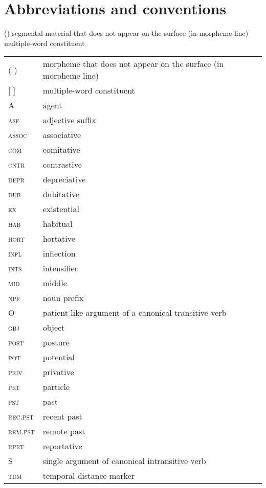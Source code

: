 \documentclass[output=paper]{langsci/langscibook}
\begin{document}
\section*{Abbreviations and conventions}
() segmental material that does not appear on the surface (in morpheme line)\\
[] multiple-word constituent

\begin{tabularx}{\textwidth}{lQ}
    ( ) & morpheme that does not appear on the surface (in morpheme line) \\
    {[} {]} & multiple-word constituent \\
    A & agent \\
    \textsc{asf} & adjective suffix \\
    \textsc{assoc} & associative \\
    \textsc{com} & comitative \\
    \textsc{cntr} & contrastive \\
    \textsc{depr} & depreciative \\
    \textsc{dub} & dubitative \\
    \textsc{ex} & existential \\
    \textsc{hab} & habitual \\
    \textsc{hort} & hortative \\
    \textsc{infl} & inflection \\
    \textsc{ints} & intensifier \\
    \textsc{mid} & middle \\
    \textsc{npf} & noun prefix \\
    O & patient-like argument of a canonical transitive verb \\
    \textsc{obj} & object \\
    \textsc{post} & posture \\
    \textsc{pot} & potential \\
    \textsc{priv} & privative \\
    \textsc{prt} & particle \\
    \textsc{pst} & past \\
    \textsc{rec.pst} & recent past \\
    \textsc{rem.pst} & remote past \\
    \textsc{rprt} & reportative \\
    S & single argument of canonical intransitive verb \\
    \textsc{tdm} & temporal distance marker \\
\end{tabularx}
\end{document}
